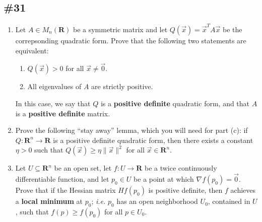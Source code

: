 \documentclass{article}
\newcommand{\R}{\mathbf{R}}
\theoremstyle{plain} %
\numberwithin{thm}{section} %
\theoremstyle{definition}
\begin{document}
        \subsection{\#31}
        \begin{enumerate}[label=(\alph*)]
			\item Let $A\in M_n(\R)$ be a symmetric matrix and let $Q(\vec{x})=\vec{x}^TA\vec{x}$ be the correpsonding quadratic form. Prove that the following two statements are equivalent:
			\begin{enumerate}[label=(\roman*)]
				\item $Q(\vec{x})> 0$ for all $\vec{x}\neq \vec{0}$.
		
				\item All eigenvalues of $A$ are strictly positive.
			\end{enumerate}
		
			In this case, we say that $Q$ is a \textbf{positive definite} quadratic form, and that $A$ is a \textbf{positive definite} matrix.
		
			\item Prove the following ``stay away'' lemma, which you will need for part (c): if $Q:\R^n\rightarrow \R$ is a positive definite quadratic form, then there exists a constant $\eta>0$ such that $Q(\vec{x})\geq \eta \|\vec{x}\|^2$ for all $\vec{x}\in \R^n$.
		
			\item Let $U\subseteq\R^n$ be an open set, let $f:U\rightarrow \R$ be a twice continuously differentiable function, and let $p_0\in U$ be a point at which $\nabla f(p_0)=\vec{0}$. Prove that if the Hessian matrix $Hf(p_0)$ is positive definite, then $f$ achieves a \textbf{local minimum} at $p_0$; \textit{i.e.} $p_0$ has an open neighborhood $U_0$, contained in $U$, such that $f(p)\geq f(p_0)$ for all $p\in U_0$.
		\end{enumerate}
\end{document}
